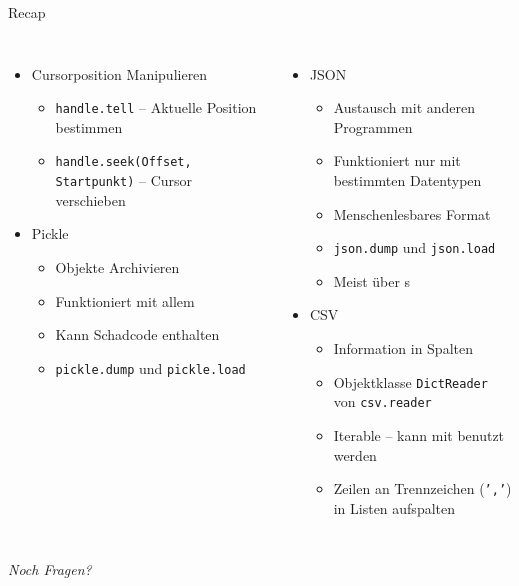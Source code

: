 
\begin{frame}{Recap}
%
\begin{columns}[T]
\begin{itemize}
\item Cursorposition Manipulieren
	\begin{itemize}
	\item \texttt{handle.tell} -- Aktuelle Position bestimmen
	\item \texttt{handle.seek(Offset, Startpunkt)} -- Cursor verschieben
	\end{itemize}
\item Pickle
	\begin{itemize}
	\item Objekte Archivieren
	\item Funktioniert mit allem
	\item Kann Schadcode enthalten
	\item \texttt{pickle.dump} und \texttt{pickle.load}
	\end{itemize}
\end{itemize}
%
\begin{itemize}
\item JSON
	\begin{itemize}
	\item Austausch mit anderen Programmen
	\item Funktioniert nur mit bestimmten Datentypen
	\item Menschenlesbares Format
	\item \texttt{json.dump} und \texttt{json.load}
	\item Meist über s
	\end{itemize}
\item CSV
	\begin{itemize}
	\item Information in Spalten
	\item Objektklasse \texttt{DictReader} von \texttt{csv.reader}
	\item Iterable -- kann mit  benutzt werden
	\item Zeilen an Trennzeichen (\zB \texttt{','}) in Listen aufspalten
	\end{itemize}
\end{itemize}

\end{columns}
%
\begin{center}
	\emph{Noch Fragen?}
\end{center}
%
\end{frame}

